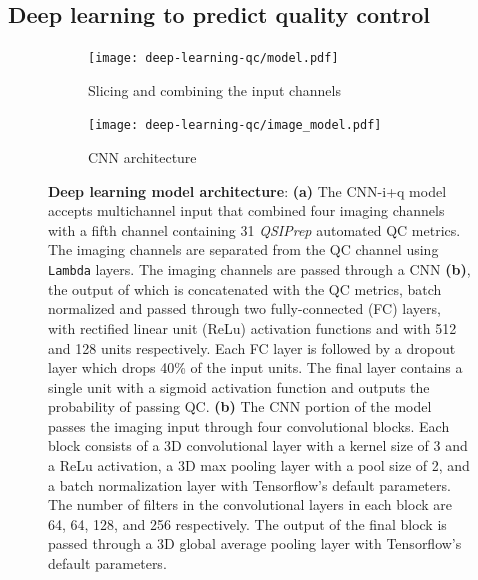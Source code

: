 \documentclass[9pt,lineno]{elife}
\begin{document}
\subsection{Deep learning to predict quality control}

\begin{figure}[tbp]
\begin{fullwidth}
    \begin{subfigure}[t]{0.6\linewidth}
    \centering
    \texttt{[image: deep-learning-qc/model.pdf]}
    \caption{Slicing and combining the input channels}
    \label{fig:dl-architecture:complete}
    \end{subfigure}
    \begin{subfigure}[t]{0.4\linewidth}
    \centering
    \texttt{[image: deep-learning-qc/image\_model.pdf]}
    \caption{CNN architecture}
    \label{fig:dl-architecture:cnn}
    \end{subfigure}
    \caption{%
        {\bf Deep learning model architecture}:
        \textbf{(a)} The CNN-i+q model accepts multichannel input that combined
        four imaging channels with a fifth channel containing 31 \emph{QSIPrep}
        automated QC metrics. The imaging channels are separated from the QC
        channel using \texttt{Lambda} layers. The imaging channels are passed
        through a CNN \textbf{(b)}, the output of which is concatenated with the
        QC metrics, batch normalized and passed through two fully-connected (FC)
        layers, with rectified linear unit (ReLu) activation functions and with
        512 and 128 units respectively. Each FC layer is followed by a dropout
        layer which drops 40\% of the input units. The final layer contains a
        single unit with a sigmoid activation function and outputs the
        probability of passing QC.
        \textbf{(b)} The CNN portion of the model passes the imaging input
        through four convolutional blocks. Each block consists of a 3D
        convolutional layer with a kernel size of 3 and a ReLu activation, a 3D
        max pooling layer with a pool size of 2, and a batch normalization layer
        with Tensorflow's default parameters. The number of filters in the
        convolutional layers in each block are 64, 64, 128, and 256 respectively.
        The output of the final block is passed through a 3D global average
        pooling layer with Tensorflow's default parameters.
    }
    \label{fig:dl-architecture}
\end{fullwidth}
\end{figure}
\end{document}
